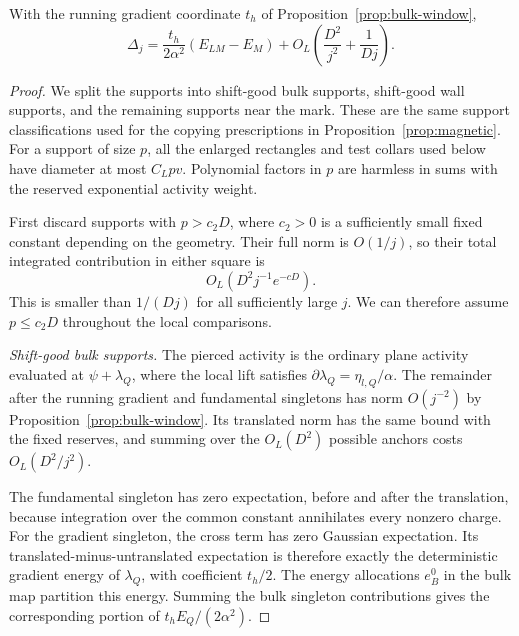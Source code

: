 \begin{lemma}
\label{lem:terminal-first-order}
With the running gradient coordinate $t_h$ of
Proposition~\ref{prop:bulk-window},
\begin{equation}
 \Delta_j
 =\frac{t_h}{2\alpha^2}(E_{LM}-E_M)
     +O_L\left(\frac{D^2}{j^2}+\frac1{Dj}\right).
 \label{eq:terminal-first-order}
\end{equation}
\end{lemma}

\begin{proof}
We split the supports into shift-good bulk supports, shift-good wall
supports, and the remaining supports near the mark.  These are the
same support classifications used for the copying prescriptions in
Proposition~\ref{prop:magnetic}.  For a support of size $p$, all the
enlarged rectangles and test collars used below have diameter at most
$C_Lpv$.  Polynomial factors in $p$ are harmless in sums with the
reserved exponential activity weight.

First discard supports with $p>c_2D$, where $c_2>0$ is a sufficiently
small fixed constant depending on the geometry.  Their full norm is
$O(1/j)$, so their total integrated contribution in either square is
\[
                   O_L(D^2j^{-1}e^{-cD}).
\]
This is smaller than $1/(Dj)$ for all sufficiently large $j$.  We can
therefore assume $p\leq c_2D$ throughout the local comparisons.

\emph{Shift-good bulk supports.}
The pierced activity is the ordinary plane activity evaluated at
$\psi+\lambda_Q$, where the local lift satisfies
$\partial\lambda_Q=\eta_{l,Q}/\alpha$.  The remainder after the
running gradient and fundamental singletons has norm $O(j^{-2})$ by
Proposition~\ref{prop:bulk-window}.  Its translated norm has the same
bound with the fixed reserves, and summing over the $O_L(D^2)$
possible anchors costs $O_L(D^2/j^2)$.

The fundamental singleton has zero expectation, before and after the
translation, because integration over the common constant annihilates
every nonzero charge.  For the gradient singleton, the cross term has
zero Gaussian expectation.  Its translated-minus-untranslated
expectation is therefore exactly the deterministic gradient energy of
$\lambda_Q$, with coefficient $t_h/2$.  The energy allocations
$e_B^0$ in the bulk map partition this energy.  Summing the bulk
singleton contributions gives the corresponding portion of
$t_hE_Q/(2\alpha^2)$.


\end{proof}
